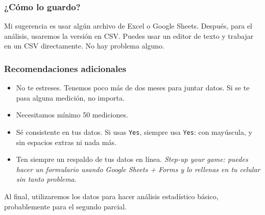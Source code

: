 \documentclass[]{book}
\theoremstyle{definition}
\begin{document}
\pagebreak

\subsubsection*{¿Cómo lo guardo?}

Mi sugerencia es usar algún archivo de Excel o Google Sheets. Después, para el análisis, usaremos la versión en CSV.
Puedes usar un editor de texto y trabajar en un CSV directamente.
No hay problema alguno.

\subsubsection*{Recomendaciones adicionales}
\begin{itemize}
    \item No te estreses. Tenemos poco más de dos meses para juntar datos. Si se te pasa alguna medición, no importa.
    \item Necesitamos mínimo 50 mediciones.
    \item Sé consistente en tus datos. Si usas \texttt{Yes}, siempre usa \texttt{Yes}: con mayúscula, y sin espacios extras ni nada más.
    \item Ten siempre un respaldo de tus datos en línea. \textit{Step-up your game: puedes hacer un formulario usando Google Sheets + Forms y lo rellenas en tu celular sin tanto problema}.
\end{itemize}

Al final, utilizaremos los datos para hacer análisis estadístico básico, probablemente para el segundo parcial.
\end{document}
